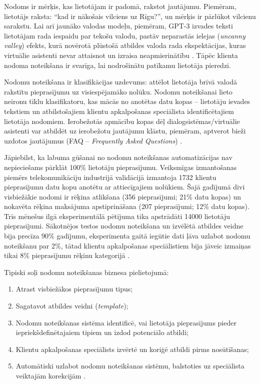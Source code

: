 
Nodoms ir mērķis, kas lietotājam ir padomā, rakstot jautājumu. Piemēram, lietotājs raksta: “kad ir nākošais vilciens uz Rīgu?”, un mērķis ir pārlūkot vilcienu sarakstu. Lai arī jaunāko valodas modeļu, piemēram, GPT-3 izvades teksti lietotājam rada iespaidu par tekošu valodu, pastāv neparastās ielejas (\textit{uncanny valley}) efekts, kurā novērotā plūstošā atbildes valoda rada ekspektācijas, kuras virtuālie asistenti nevar attaisnot un izraisa neapmierinātību \cite{paikens2020}. Tāpēc klienta nodoma noteikšana ir svarīga, lai nodrošinātu patīkamu lietotāja pieredzi.

Nodomu noteikšana ir klasifikācijas uzdevums: attēlot lietotāja brīvā valodā rakstītu pieprasījumu uz visiespējamāko nolūku. Nodomu noteikšanai lieto neironu tīklu klasifikatoru, kas mācās no anotētas datu kopas -- lietotāju ievades tekstiem un atbilstošajiem klientu apkalpošanas speciālista identificētajiem lietotāja nodomiem. Ierobežotās apmācību kopas dēļ dialogsistēmas/virtuālie asistenti var atbildēt uz ierobežotu jautājumu klāstu, piemēram, aptverot bieži uzdotos jautājumus (FAQ -- \textit{Frequently Asked Questions}) \cite{fasttext2019}.

Jāpiebilst, ka labuma gūšanai no nodomu noteikšanas automatizācijas nav nepieciešams pārklāt 100\% lietotāju pieprasījumu. Veiksmīgas izmantošanas piemērs telekomunikāciju industrijā validācijā izmantoja 1732 klientu pieprasījumu datu kopu anotētu ar attiecīgajiem nolūkiem. Šajā gadījumā divi visbiežākie nodomi ir rēķina atlikšana (356 pieprasījumi; 21\% datu kopas) un nokavēta rēķina maksājuma apstiprināšana (207 pieprasījumi; 12\% datu kopas). Trīs mēnešus ilgā eksperimentālā pētījuma tika apstrādāti 14000 lietotāju pieprasījumi. Sākotnējos testos nodomu noteikšana un izvēlētā atbildes veidne bija precīza 90\% gadījumu, eksperimenta gaitā iegūtie dati ļāva uzlabot nodomu noteikšanu par 2\%, tātad klientu apkalpošanas speciālistiem bija jāveic izmaiņas tikai 8\% pieprasījumu rēķinu kategorijā \cite{paikens2020}.

Tipiski soļi nodomu noteikšanas biznesa pielietojumā:
\begin{enumerate}
	\item Atrast visbiežākos pieprasījumu tipus;
	\item Sagatavot atbildes veidni (\textit{template});
	\item Nodomu noteikšanas sistēma identificē, vai lietotāja pieprasījums pieder iepriekšdefinētajaiem tipiem un izdod potenciālo atbildi;
	\item Klientu apkalpošanas speciālists izvērtē un koriģē atbildi pirms nosūtīšanas;
	\item Automātiski uzlabot nodomu noteikšanas sistēmu, balstoties uz speciālista veiktajām korekcijām \cite{paikens2020}.
\end{enumerate}
